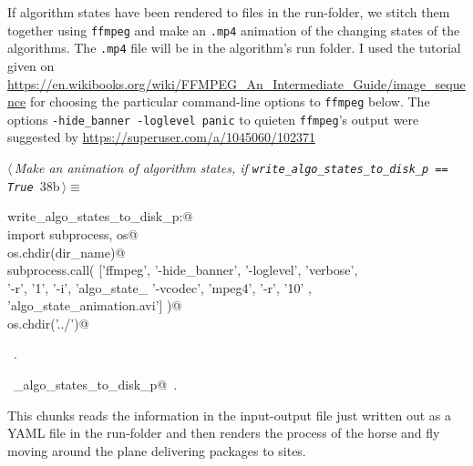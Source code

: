 \documentclass[11.5pt]{report}
\begin{document}
\vspace{-0.8cm}\newchunk If algorithm states have been rendered to files in the run-folder, we stitch them together using \verb|ffmpeg|
and make an \verb|.mp4| animation of the changing states of the algorithms. The \verb|.mp4| file will be in the algorithm's
run folder. I used the  tutorial given on \url{https://en.wikibooks.org/wiki/FFMPEG_An_Intermediate_Guide/image_sequence}
for choosing the particular command-line options to \verb|ffmpeg| below. The options \texttt{-hide\_banner -loglevel panic} 
to quieten \verb|ffmpeg|'s output were suggested by  \url{https://superuser.com/a/1045060/102371} 


\begin{flushleft} \small\label{scrap40}\raggedright\small
{} $\langle\,${\itshape Make an animation of algorithm states, if \verb|write_algo_states_to_disk_p == True|}\nobreak\ {\footnotesize {38b}}$\,\rangle\equiv$
\vspace{-1ex}
\begin{list}{}{} \item
\mbox{}\verb@if write_algo_states_to_disk_p:@\\
\mbox{}\verb@     import subprocess, os@\\
\mbox{}\verb@     os.chdir(dir_name)@\\
\mbox{}\verb@     subprocess.call( ['ffmpeg',  '-hide_banner', '-loglevel', 'verbose', \@\\
\mbox{}\verb@                       '-r', '1',  '-i', 'algo_state_%05d.png', \@\\
\mbox{}\verb@                       '-vcodec', 'mpeg4', '-r', '10' , \@\\
\mbox{}\verb@                       'algo_state_animation.avi']  )@\\
\mbox{}\verb@     os.chdir('../')@\\
\mbox{}\verb@@{\NWsep}
\end{list}
\vspace{-1.5ex}
\footnotesize
\begin{list}{}{\setlength{\itemsep}{-\parsep}\setlength{\itemindent}{-\leftmargin}}
\item \NWtxtMacroRefIn\ .
\item \NWtxtIdentsUsed\nobreak\  \verb@write_algo_states_to_disk_p@\nobreak\ .
\item{}
\end{list}
\vspace{4ex}
\end{flushleft}
\vspace{-0.8cm} \newchunk This chunks reads the information in the input-output file just written out as
a YAML file in the run-folder and then renders the process of the horse and fly moving around the plane 
delivering packages to sites. 
\end{document}
